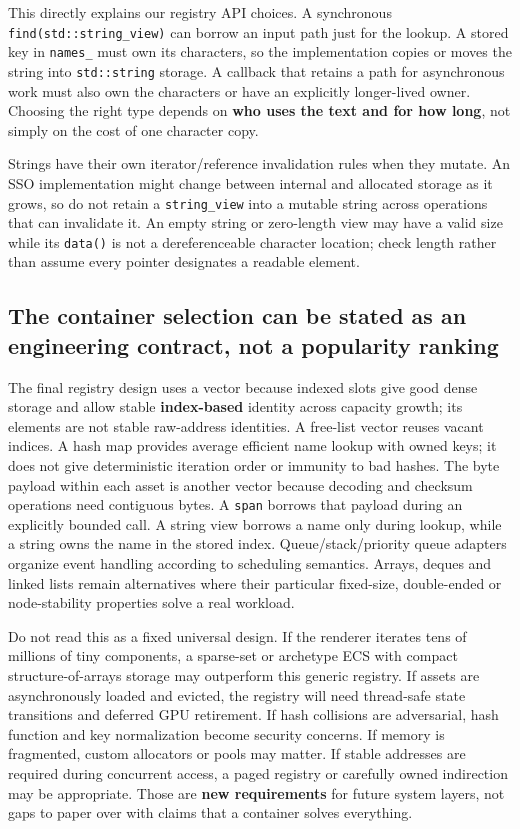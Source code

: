 This directly explains our registry API choices. A synchronous \texttt{find(std::string\_view)} can borrow an input path just for the lookup. A stored key in \texttt{names\_} must own its characters, so the implementation copies or moves the string into \texttt{std::string} storage. A callback that retains a path for asynchronous work must also own the characters or have an explicitly longer-lived owner. Choosing the right type depends on \textbf{who uses the text and for how long}, not simply on the cost of one character copy.

Strings have their own iterator/reference invalidation rules when they mutate. An SSO implementation might change between internal and allocated storage as it grows, so do not retain a \texttt{string\_view} into a mutable string across operations that can invalidate it. An empty string or zero-length view may have a valid size while its \texttt{data()} is not a dereferenceable character location; check length rather than assume every pointer designates a readable element.

\subsection{The container selection can be stated as an engineering contract, not a popularity ranking}\label{01-foundations-i-ch006-the-container-selection-can-be-stated-as-an-engineering-contract-not-a-popularity-ranking}

The final registry design uses a vector because indexed slots give good dense storage and allow stable \textbf{index-based} identity across capacity growth; its elements are not stable raw-address identities. A free-list vector reuses vacant indices. A hash map provides average efficient name lookup with owned keys; it does not give deterministic iteration order or immunity to bad hashes. The byte payload within each asset is another vector because decoding and checksum operations need contiguous bytes. A \texttt{span} borrows that payload during an explicitly bounded call. A string view borrows a name only during lookup, while a string owns the name in the stored index. Queue/stack/priority queue adapters organize event handling according to scheduling semantics. Arrays, deques and linked lists remain alternatives where their particular fixed-size, double-ended or node-stability properties solve a real workload.

Do not read this as a fixed universal design. If the renderer iterates tens of millions of tiny components, a sparse-set or archetype ECS with compact structure-of-arrays storage may outperform this generic registry. If assets are asynchronously loaded and evicted, the registry will need thread-safe state transitions and deferred GPU retirement. If hash collisions are adversarial, hash function and key normalization become security concerns. If memory is fragmented, custom allocators or pools may matter. If stable addresses are required during concurrent access, a paged registry or carefully owned indirection may be appropriate. Those are \textbf{new requirements} for future system layers, not gaps to paper over with claims that a container solves everything.

